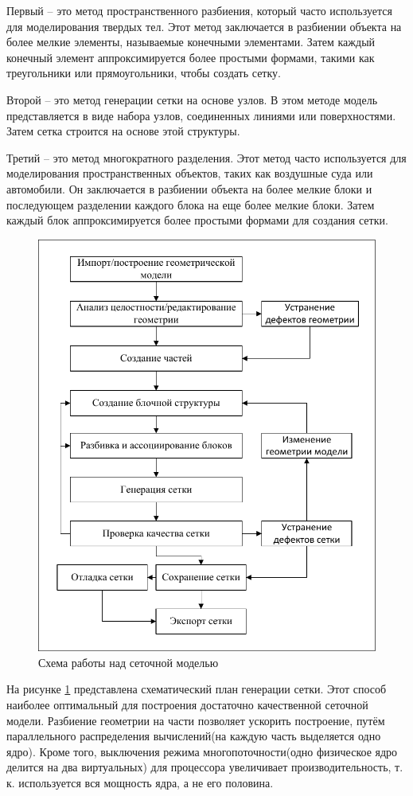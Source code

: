 	Первый -- это метод пространственного разбиения, который часто используется для моделирования твердых тел. Этот метод заключается в разбиении объекта на более мелкие элементы, называемые конечными элементами. Затем каждый конечный элемент аппроксимируется более простыми формами, такими как треугольники или прямоугольники, чтобы создать сетку.
	
	Второй -- это метод генерации сетки на основе узлов. В этом методе модель представляется в виде набора узлов, соединенных линиями или поверхностями. Затем сетка строится на основе этой структуры.
	
	Третий -- это метод многократного разделения. Этот метод часто используется для моделирования пространственных объектов, таких как воздушные суда или автомобили. Он заключается в разбиении объекта на более мелкие блоки и последующем разделении каждого блока на еще более мелкие блоки. Затем каждый блок аппроксимируется более простыми формами для создания сетки.
	
	\begin{figure}[H]
		\centering
		\includegraphics[width=0.8\linewidth]{../Assets/СхемаСозданияСеткиRU}
		\caption{Схема работы над сеточной моделью}
		\label{fig:meshScheme}
	\end{figure}
	
	На рисунке \ref{fig:meshScheme} представлена схематический план генерации сетки. Этот способ наиболее оптимальный для построения достаточно качественной сеточной модели. Разбиение геометрии на части позволяет ускорить построение, путём параллельного распределения вычислений(на каждую часть выделяется одно ядро). Кроме того, выключения режима многопоточности(одно физическое ядро делится на два виртуальных) для процессора увеличивает производительность, т. к. используется вся мощность ядра, а не его половина.
	
